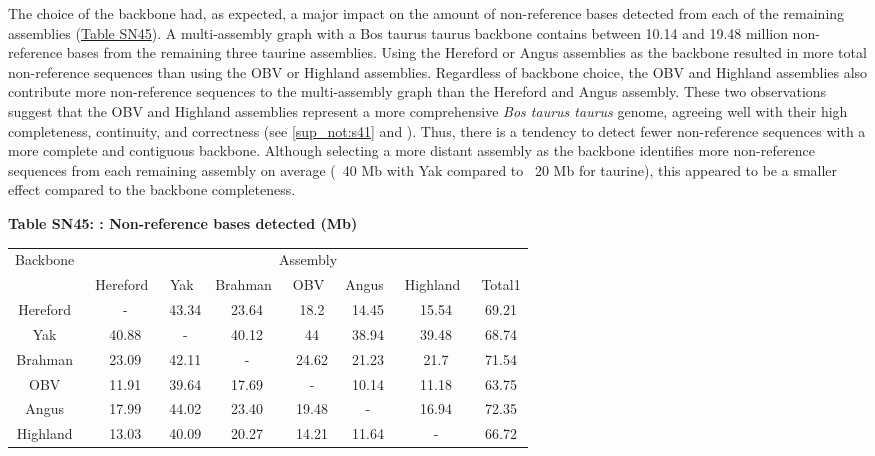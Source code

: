 \documentclass[../main.tex]{subfiles}
\begin{document}
\begin{flushleft}
The choice of the backbone had, as expected, a major impact on the amount of non-reference bases detected from each of the remaining assemblies (\hyperlink{Table SN45}{Table SN45}). A multi-assembly graph with a Bos taurus taurus backbone contains between 10.14 and 19.48 million non-reference bases from the remaining three taurine assemblies. Using the Hereford or Angus assemblies as the backbone resulted in more total non-reference sequences than using the OBV or Highland assemblies. Regardless of backbone choice, the OBV and Highland assemblies also contribute more non-reference sequences to the multi-assembly graph than the Hereford and Angus assembly. These two observations suggest that the OBV and Highland assemblies represent a more comprehensive \emph{Bos taurus taurus} genome, agreeing well with their high completeness, continuity, and correctness (see \ref{sup_not:s41} and \citep{rice2020continuous}). Thus, there is a tendency to detect fewer non-reference sequences with a more complete and contiguous backbone. Although selecting a more distant assembly as the backbone identifies more non-reference sequences from each remaining assembly on average (~40 Mb with Yak compared to ~20 Mb for taurine), this appeared to be a smaller effect compared to the backbone completeness.

\bigskip

\textbf{\hypertarget{Table SN45}{Table SN45}: : Non-reference bases detected (Mb)}
\begin{center}
    \begin{tabular}{|c|c|c|c|c|c|c|c|}
    \hline
    \multirow{2}{*}{Backbone~} & \multicolumn{7}{c|}{Assembly}                                       \\
    \cline{2-8}
                               & Hereford~ & Yak~  & Brahman~ & OBV~  & Angus~ & Highland~ & Total1  \\
    \hline
    Hereford~                  & -         & 43.34 & 23.64    & 18.2  & 14.45  & 15.54     & 69.21   \\
    \hline
    Yak~                       & 40.88     & -     & 40.12    & 44    & 38.94  & 39.48     & 68.74   \\
    \hline
    Brahman~                   & 23.09     & 42.11 & -        & 24.62 & 21.23  & 21.7      & 71.54   \\
    \hline
    OBV~                       & 11.91     & 39.64 & 17.69    & -     & 10.14  & 11.18     & 63.75   \\
    \hline
    Angus~                     & 17.99     & 44.02 & 23.40    & 19.48 & -      & 16.94     & 72.35   \\
    \hline
    Highland~                  & 13.03     & 40.09 & 20.27    & 14.21 & 11.64  & -         & 66.72   \\
    \hline
    \end{tabular}
\end{center}


\end{flushleft}
\end{document}
